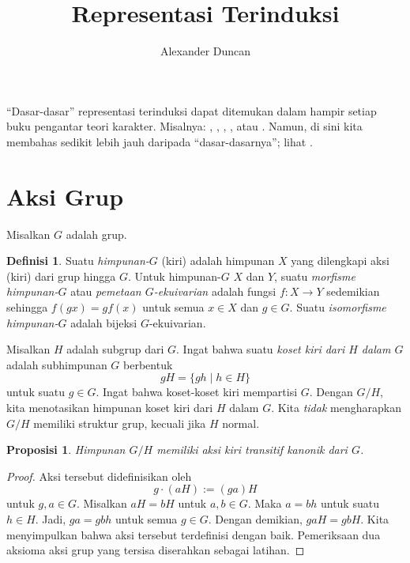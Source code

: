 \documentclass[12pt]{article}
\theoremstyle{plain}
\newtheorem{proposition}[theorem]{Proposisi}
\theoremstyle{definition}
\newtheorem{definition}[theorem]{Definisi}
\theoremstyle{remark}
\numberwithin{equation}{section}
\begin{document}
\title{Representasi Terinduksi}
\author{Alexander Duncan}

\maketitle

``Dasar-dasar'' representasi terinduksi dapat ditemukan dalam hampir
setiap buku pengantar teori karakter. Misalnya:
\cite[\S{16}]{AlperinBell},
\cite[\S{5.8-5.11}]{Etingof},
\cite[\S{3.3}]{FultonHarris},
\cite[\S{XVIII.6--9}]{Lang}, atau
\cite[\S{3.3}]{Serre}.
Namun, di sini kita membahas sedikit lebih jauh daripada ``dasar-dasarnya'';
lihat \cite[\S{7--10}]{Serre}.


\section{Aksi Grup}

Misalkan $G$ adalah grup.

\begin{definition}
Suatu \emph{himpunan-$G$} (kiri) adalah himpunan $X$ yang dilengkapi aksi (kiri) dari
grup hingga $G$. Untuk himpunan-$G$ $X$ dan $Y$, suatu \emph{morfisme himpunan-$G$}
atau \emph{pemetaan $G$-ekuivarian} adalah fungsi $f : X \to Y$
sedemikian sehingga $f(gx)=gf(x)$ untuk semua $x \in X$ dan $g \in G$.
Suatu \emph{isomorfisme himpunan-$G$} adalah bijeksi $G$-ekuivarian.
\end{definition}

Misalkan $H$ adalah subgrup dari $G$. Ingat bahwa suatu \emph{koset kiri dari $H$ dalam
$G$} adalah subhimpunan $G$ berbentuk
\[
gH = \{ gh \mid h \in H \}
\]
untuk suatu $g \in G$. Ingat bahwa koset-koset kiri mempartisi $G$.
Dengan $G/H$, kita menotasikan himpunan koset kiri dari $H$ dalam $G$.
Kita \emph{tidak} mengharapkan $G/H$ memiliki struktur grup, kecuali jika $H$
normal.

\begin{proposition}
Himpunan $G/H$ memiliki aksi kiri transitif kanonik dari $G$.
\end{proposition}

\begin{proof}
Aksi tersebut didefinisikan oleh
\[
g \cdot (aH) := (ga)H
\]
untuk $g,a \in G$.
Misalkan $aH=bH$ untuk $a,b \in G$. Maka $a=bh$ untuk suatu $h \in H$.
Jadi, $ga=gbh$ untuk semua $g \in G$. Dengan demikian, $gaH=gbH$.
Kita menyimpulkan bahwa aksi tersebut terdefinisi dengan baik.
Pemeriksaan dua aksioma aksi grup yang tersisa diserahkan sebagai latihan.
\end{proof}
\end{document}
